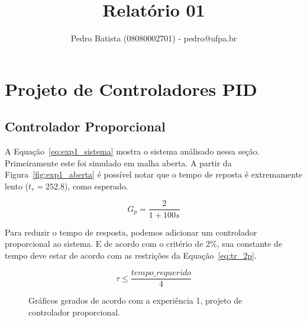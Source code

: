\documentclass[a4paper]{article}
\title{Relatório 01}
\author{Pedro Batista (08080002701) - pedro@ufpa.br}
\begin{document}
\maketitle

\section{Projeto de Controladores PID}

\subsection{Controlador Proporcional}
A Equação~\ref{eq:exp1_sistema} mostra o sistema análisado nessa seção.
Primeiramente este foi simulado em malha aberta. A partir da
Figura~\ref{fig:exp1_aberta} é possível notar que o tempo de reposta
é extremamente lento ($t_r=252.8$), como esperado.

\begin{equation}
G_p=\frac{2}{1+100s}
\label{eq:exp1_sistema}
\end{equation}

Para reduzir o tempo de resposta, podemos adicionar um controlador proporcional
ao sistema. E de acordo com o critério de 2\%, sua constante de tempo deve
estar de acordo com as restrições da Equação~\ref{eq:tr_2p}.

\begin{equation}
\tau \leq \frac{tempo\_requerido}{4}
\label{eq:tr_2p}
\end{equation}

\begin{figure}[h]
   \caption{Gráficos gerados de acordo com a experiência 1, projeto de controlador
      proporcional.}
   \label{fig:primeira_ordem}
\end{figure}


 
\end{document}
